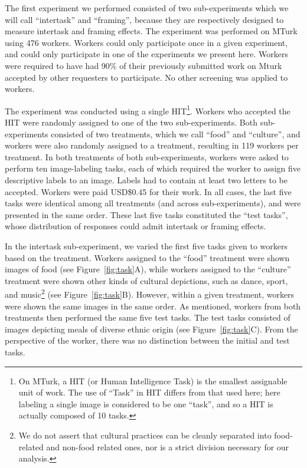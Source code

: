 \documentclass{sigchi}
\begin{document}
The first experiment we performed consisted of two sub-experiments which
we will call ``intertask'' and ``framing'', because they are respectively
designed to measure intertask and framing effects.  The experiment was 
performed on MTurk using 476 workers.  Workers
could only participate once in a given experiment, and could only 
participate in one of the experiments we present here.  Workers were 
required to have had 90\% of their previously submitted work on Mturk 
accepted by other requesters to participate.  No other screening 
was applied to workers.

The experiment was conducted using a single HIT\footnote{
  On MTurk, a HIT (or Human Intelligence Task) is the smallest 
  assignable unit of work.  The use of ``Task'' in HIT differs from that
  used here; here labeling a single image is considered to be one ``task'',
  and so a HIT is actually composed of 10 tasks.
}.  Workers who accepted the HIT were randomly assigned to one of the two
sub-experiments.  Both sub-experiments consisted of two treatments, which
we call ``food'' and ``culture'', and workers were also randomly 
assigned to a treatment, resulting in 119 workers per treatment.  
In both treatments of both sub-experiments,
workers were asked to perform ten image-labeling tasks, each of which 
required the worker to assign five descriptive labels to an image.  
Labels had to contain at least two letters to be accepted. 
Workers were paid USD\$0.45 for their work.
In all cases, the last five tasks were identical among all treatments 
(and across sub-experiments), and were presented in the same order.  
These last five tasks constituted the ``test tasks'', whose distribution
of responses could admit intertask or framing effects.

In the intertask sub-experiment, we varied the first five tasks given to 
workers based on the treatment.  Workers assigned to the ``food'' 
treatment were shown images of food (see Figure~\ref{fig:task}A), 
while workers assigned to the ``culture'' treatment were shown other kinds 
of cultural depictions, such as dance, sport, and 
music\footnote{
  We do not assert that cultural practices can be cleanly separated into 
  food-related and non-food related ones, nor is a strict division 
  necessary for our analysis.
} (see Figure~\ref{fig:task}B).  
However, within a given treatment, workers were shown the same images in
the same order.  As mentioned, workers 
from both treatments then performed the same five test tasks.  The test
tasks consisted of images depicting meals of diverse ethnic origin
(see Figure~\ref{fig:task}C).
From the perspective of the worker, there was no distinction between the 
initial and test tasks.
\end{document}
